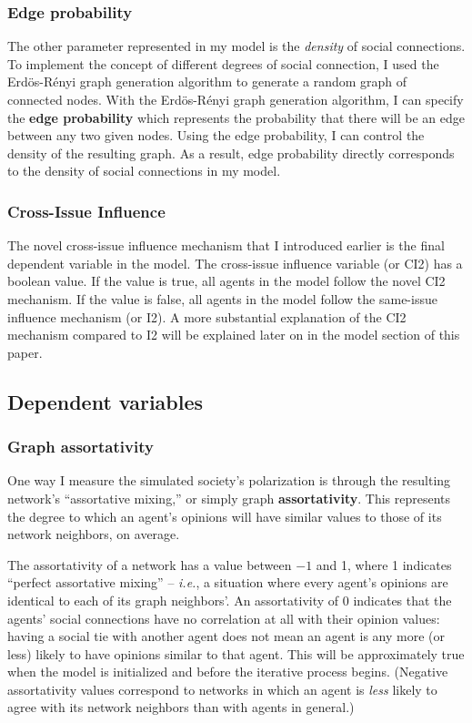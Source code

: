 \subsubsection{Edge probability}

The other parameter represented in my model is the \textit{density} of social
connections. To implement the concept of different degrees of social
connection, I used the Erd\"{o}s-R\'{e}nyi graph generation algorithm to
generate a random graph of connected nodes. With the Erd\"{o}s-R\'{e}nyi graph
generation algorithm, I can specify the \textbf{edge probability} which represents the
probability that there will be an edge between any two given nodes. Using the
edge probability, I can control the density of the resulting graph. As a
result, edge probability directly corresponds to the density of social
connections in my model.    

\subsubsection{Cross-Issue Influence}
The novel cross-issue influence mechanism that I introduced earlier is the final dependent variable in the model. The cross-issue influence variable (or CI2) has a boolean value. If the value is true, all agents in the model follow the novel CI2 mechanism. If the value is false, all agents in the model follow the same-issue influence mechanism (or I2). A more substantial explanation of the CI2 mechanism compared to I2 will be explained later on in the model section of this paper. 

\subsection{Dependent variables}

\subsubsection{Graph assortativity}

One way I measure the simulated society's polarization is through the
resulting network's ``assortative mixing,'' or simply graph
\textbf{assortativity}. This represents the degree to which an agent's opinions
will have similar values to those of its network neighbors, on average.

The assortativity of a network has a value between $-1$ and 1, where 1
indicates ``perfect assortative mixing'' -- \textit{i.e.}, a situation where
every agent's opinions are identical to each of its graph neighbors'. An
assortativity of 0 indicates that the agents' social connections have no
correlation at all with their opinion values: having a social tie with another
agent does not mean an agent is any more (or less) likely to have opinions
similar to that agent. This will be approximately true when the model is
initialized and before the iterative process begins. (Negative assortativity
values correspond to networks in which an agent is \textit{less} likely to
agree with its network neighbors than with agents in general.)

